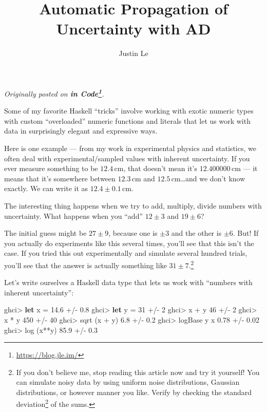 \documentclass[]{article}
\title{Automatic Propagation of Uncertainty with AD}
\author{Justin Le}
\newenvironment{Shaded}{}{}
\newcommand{\KeywordTok}[1]{\textcolor[rgb]{0.00,0.44,0.13}{\textbf{{#1}}}}
\newcommand{\DecValTok}[1]{\textcolor[rgb]{0.25,0.63,0.44}{{#1}}}
\newcommand{\FloatTok}[1]{\textcolor[rgb]{0.25,0.63,0.44}{{#1}}}
\newcommand{\FunctionTok}[1]{\textcolor[rgb]{0.02,0.16,0.49}{{#1}}}
\newcommand{\NormalTok}[1]{{#1}}
\renewcommand{\href}[2]{#2\footnote{\url{#1}}}
\begin{document}
\maketitle

\emph{Originally posted on \textbf{\href{https://blog.jle.im/}{in
Code}}.}

Some of my favorite Haskell ``tricks'' involve working with exotic
numeric types with custom ``overloaded'' numeric functions and literals
that let us work with data in surprisingly elegant and expressive ways.

Here is one example --- from my work in experimental physics and
statistics, we often deal with experimental/sampled values with inherent
uncertainty. If you ever measure something to be \(12.4\,\mathrm{cm}\),
that doesn't mean it's \(12.400000\,\mathrm{cm}\) --- it means that it's
somewhere between \(12.3\,\mathrm{cm}\) and
\(12.5\,\mathrm{cm}\)\ldots{}and we don't know exactly. We can write it
as \(12.4 \pm 0.1\,\mathrm{cm}\).

The interesting thing happens when we try to add, multiply, divide
numbers with uncertainty. What happens when you ``add'' \(12 \pm 3\) and
\(19 \pm 6\)?

The initial guess might be \(27 \pm 9\), because one is \(\pm 3\) and
the other is \(\pm 6\). But! If you actually do experiments like this
several times, you'll see that this isn't the case. If you tried this
out experimentally and simulate several hundred trials, you'll see that
the answer is actually something like \(31 \pm 7\).\footnote{If you
  don't believe me, stop reading this article now and try it yourself!
  You can simulate noisy data by using uniform noise distributions,
  Gaussian distributions, or however manner you like. Verify by checking
  the \href{https://en.wikipedia.org/wiki/Standard_deviation}{standard
  deviation} of the sums.}

Let's write ourselves a Haskell data type that lets us work with
``numbers with inherent uncertainty'':

\begin{Shaded}
\begin{Highlighting}[]
\NormalTok{ghci}\FunctionTok{>} \KeywordTok{let} \NormalTok{x }\FunctionTok{=} \FloatTok{14.6} \FunctionTok{+/-} \FloatTok{0.8}
\NormalTok{ghci}\FunctionTok{>} \KeywordTok{let} \NormalTok{y }\FunctionTok{=} \DecValTok{31}   \FunctionTok{+/-} \DecValTok{2}
\NormalTok{ghci}\FunctionTok{>} \NormalTok{x }\FunctionTok{+} \NormalTok{y}
\DecValTok{46} \FunctionTok{+/-} \DecValTok{2}
\NormalTok{ghci}\FunctionTok{>} \NormalTok{x }\FunctionTok{*} \NormalTok{y}
\DecValTok{450} \FunctionTok{+/-} \DecValTok{40}
\NormalTok{ghci}\FunctionTok{>} \NormalTok{sqrt (x }\FunctionTok{+} \NormalTok{y)}
\FloatTok{6.8} \FunctionTok{+/-} \FloatTok{0.2}
\NormalTok{ghci}\FunctionTok{>} \NormalTok{logBase y x}
\FloatTok{0.78} \FunctionTok{+/-} \FloatTok{0.02}
\NormalTok{ghci}\FunctionTok{>} \NormalTok{log (x}\FunctionTok{**}\NormalTok{y)}
\FloatTok{85.9} \FunctionTok{+/-} \FloatTok{0.3}
\end{Highlighting}
\end{Shaded}
\end{document}
